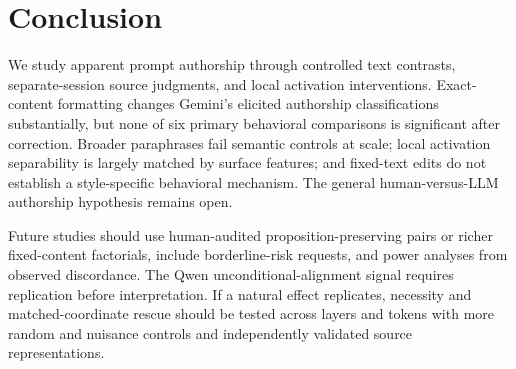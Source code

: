 \section{Conclusion}
\label{sec:conclusion}
We study apparent prompt authorship through controlled text contrasts, separate-session source judgments, and local activation interventions. Exact-content formatting changes Gemini's elicited authorship classifications substantially, but none of six primary behavioral comparisons is significant after correction. Broader paraphrases fail semantic controls at scale; local activation separability is largely matched by surface features; and fixed-text edits do not establish a style-specific behavioral mechanism. The general human-versus-LLM authorship hypothesis remains open.

Future studies should use human-audited proposition-preserving pairs or richer fixed-content factorials, include borderline-risk requests, and power analyses from observed discordance. The Qwen unconditional-alignment signal requires replication before interpretation. If a natural effect replicates, necessity and matched-coordinate rescue should be tested across layers and tokens with more random and nuisance controls and independently validated source representations.
